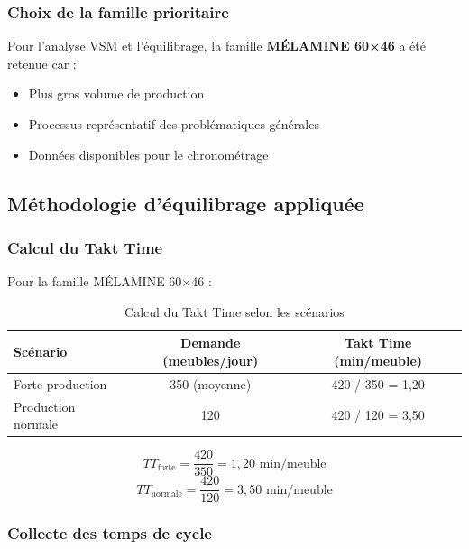 \documentclass[12pt,a4paper]{article}
\begin{document}
\begin{center}
\subsubsection{Choix de la famille prioritaire}

Pour l'analyse VSM et l'équilibrage, la famille \textbf{MÉLAMINE 60×46} a été retenue car :
\begin{itemize}
    \item Plus gros volume de production
    \item Processus représentatif des problématiques générales
    \item Données disponibles pour le chronométrage
\end{itemize}

\subsection{Méthodologie d'équilibrage appliquée}

\subsubsection{Calcul du Takt Time}

Pour la famille MÉLAMINE 60×46 :

\begin{table}[H]
\centering
\caption{Calcul du Takt Time selon les scénarios}
\label{tab:ynion_takt}
\begin{tabular}{|l|c|c|}
\hline
\textbf{Scénario} & \textbf{Demande (meubles/jour)} & \textbf{Takt Time (min/meuble)} \\ \hline
Forte production & 350 (moyenne) & 420 / 350 = 1,20 \\ \hline
Production normale & 120 & 420 / 120 = 3,50 \\ \hline
\end{tabular}
\end{table}

\[
TT_{\text{forte}} = \frac{420}{350} = 1,20 \text{ min/meuble}
\]
\[
TT_{\text{normale}} = \frac{420}{120} = 3,50 \text{ min/meuble}
\]

\subsubsection{Collecte des temps de cycle}


\end{center}
\end{document}
